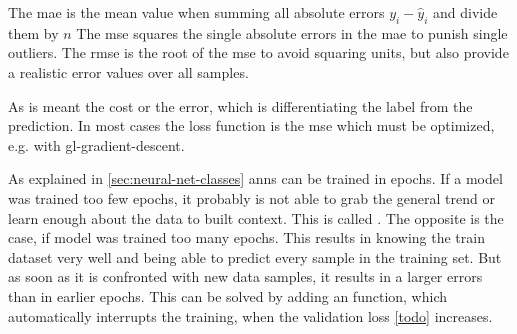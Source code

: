 The \gls{mae} is the mean value when summing all absolute errors $y_i - \hat{y}_i$ and divide them by $n$
The \gls{mse} squares the single absolute errors in the \gls{mae} to punish single outliers.
The \gls{rmse} is the root of the \gls{mse} to avoid squaring units, but also provide a realistic error values over all samples.

As  is meant the cost or the error, which is differentiating the label from the prediction.
In most cases the loss function is the \gls{mse} which must be optimized, e.g. with \gls{gl-gradient-descent}.

As explained in \ref{sec:neural-net-classes} \gls{ann}s can be trained in epochs.
If a model was trained too few epochs, it probably is not able to grab the general trend or learn enough about the data to built context.
This is called .
The opposite  is the case, if model was trained too many epochs.
This results in knowing the train dataset very well and being able to predict every sample in the training set.
But as soon as it is confronted with new data samples, it results in a larger errors than in earlier epochs.
This can be solved by adding an  function, which automatically interrupts the training, when the validation loss \ref{todo} increases.

